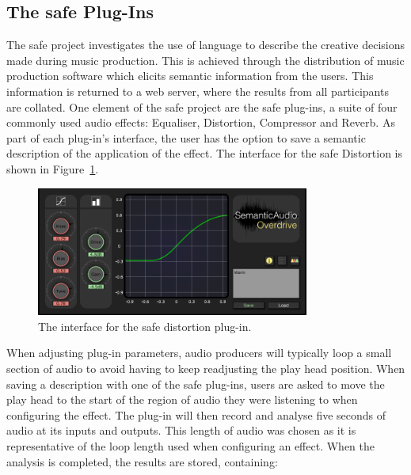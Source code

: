 	\subsection{The \acrshort{safe} Plug-Ins}
	\label{sec:TimbreEvaluation-DAWBasedTimbreEvaluation-SAFE}
		The \acrshort{safe} project \citep{stables2014safe} investigates the use of language to describe the
		creative decisions made during music production. This is achieved through the distribution of music
		production software which elicits semantic information from the users. This information is returned to a
		web server, where the results from all participants are collated. One element of the \acrshort{safe}
		project are the \acrshort{safe} plug-ins, a suite of four commonly used audio effects: Equaliser,
		Distortion, Compressor and Reverb. As part of each plug-in's interface, the user has the option to save a
		semantic description of the application of the effect. The interface for the \acrshort{safe} Distortion is
		shown in Figure~\ref{fig:SAFE-Distortion}.

		\begin{figure}[h!]
			\centering
			\includegraphics[width=0.8\textwidth]{chapter4/Images/SAFEDistortion.png}
			\caption{The interface for the \acrshort{safe} distortion plug-in.}
			\label{fig:SAFE-Distortion}
		\end{figure}
		
		When adjusting plug-in parameters, audio producers will typically loop a small section of audio to avoid
		having to keep readjusting the play head position. When saving a description with one of the
		\acrshort{safe} plug-ins, users are asked to move the play head to the start of the region of audio they
		were listening to when configuring the effect. The plug-in will then record and analyse five seconds of
		audio at its inputs and outputs. This length of audio was chosen as it is representative of the loop
		length used when configuring an effect. When the analysis is completed, the results are stored, containing:

